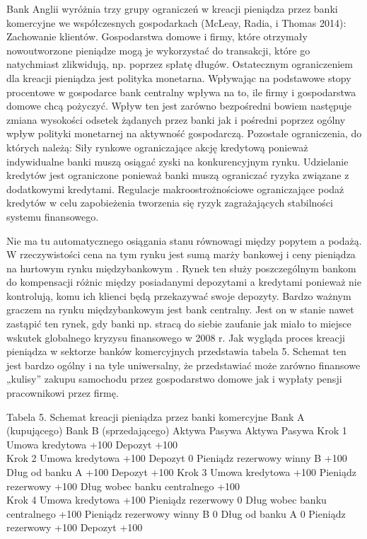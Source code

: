 \documentclass[
]{book}
\begin{document}
Bank Anglii wyróżnia trzy grupy ograniczeń w kreacji pieniądza przez banki komercyjne we współczesnych gospodarkach (McLeay, Radia, i Thomas 2014):
Zachowanie klientów. Gospodarstwa domowe i firmy, które otrzymały nowoutworzone pieniądze mogą je wykorzystać do transakcji, które go natychmiast zlikwidują, np. poprzez spłatę długów.
Ostatecznym ograniczeniem dla kreacji pieniądza jest polityka monetarna. Wpływając na podstawowe stopy procentowe w gospodarce bank centralny wpływa na to, ile firmy i gospodarstwa domowe chcą pożyczyć. Wpływ ten jest zarówno bezpośredni bowiem następuje zmiana wysokości odsetek żądanych przez banki jak i pośredni poprzez ogólny wpływ polityki monetarnej na aktywność gospodarczą.
Pozostałe ograniczenia, do których należą:
Siły rynkowe ograniczające akcję kredytową ponieważ indywidualne banki muszą osiągać zyski na konkurencyjnym rynku.
Udzielanie kredytów jest ograniczone ponieważ banki muszą ograniczać ryzyka związane z dodatkowymi kredytami.
Regulacje makroostrożnościowe ograniczające podaż kredytów w celu zapobieżenia tworzenia się ryzyk zagrażających stabilności systemu finansowego.

Nie ma tu automatycznego osiągania stanu równowagi między popytem a podażą. W rzeczywistości cena na tym rynku jest sumą marży bankowej i ceny pieniądza na hurtowym rynku międzybankowym . Rynek ten służy poszczególnym bankom do kompensacji różnic między posiadanymi depozytami a kredytami ponieważ nie kontrolują, komu ich klienci będą przekazywać swoje depozyty. Bardzo ważnym graczem na rynku międzybankowym jest bank centralny. Jest on w stanie nawet zastąpić ten rynek, gdy banki np. stracą do siebie zaufanie jak miało to miejsce wskutek globalnego kryzysu finansowego w 2008 r.
Jak wygląda proces kreacji pieniądza w sektorze banków komercyjnych przedstawia tabela 5. Schemat ten jest bardzo ogólny i na tyle uniwersalny, że przedstawiać może zarówno finansowe „kulisy'' zakupu samochodu przez gospodarstwo domowe jak i wypłaty pensji pracownikowi przez firmę.

Tabela 5. Schemat kreacji pieniądza przez banki komercyjne
Bank A (kupującego) Bank B (sprzedającego)
Aktywa Pasywa Aktywa Pasywa
Krok 1 Umowa kredytowa +100 Depozyt +100\\
Krok 2 Umowa kredytowa +100 Depozyt 0
Pieniądz rezerwowy winny B +100 Dług od banku A +100 Depozyt +100
Krok 3 Umowa kredytowa +100
Pieniądz rezerwowy +100 Dług wobec banku centralnego +100\\
Krok 4 Umowa kredytowa +100
Pieniądz rezerwowy 0 Dług wobec banku centralnego +100
Pieniądz rezerwowy winny B 0 Dług od banku A 0
Pieniądz rezerwowy +100 Depozyt +100
\end{document}
